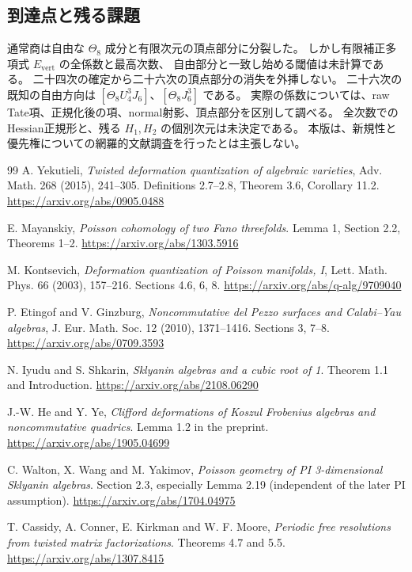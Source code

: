 \documentclass[a4paper,11pt]{ltjsarticle}
\theoremstyle{definition}
\begin{document}
\subsection{到達点と残る課題}

通常商は自由な $\Theta_8$ 成分と有限次元の頂点部分に分裂した。
しかし有限補正多項式 $E_{\mathrm{vert}}$ の全係数と最高次数、
自由部分と一致し始める閾値は未計算である。
二十四次の確定から二十六次の頂点部分の消失を外挿しない。
二十六次の既知の自由方向は
$[\Theta_8U_4^3J_6]$、$[\Theta_8J_6^3]$ である。
実際の係数については、raw Tate項、正規化後の項、normal射影、頂点部分を区別して調べる。
全次数でのHessian正規形と、残る $H_1,H_2$ の個別次元は未決定である。
本版は、新規性と優先権についての網羅的文献調査を行ったとは主張しない。


\begin{thebibliography}{99}
\small
{}
A. Yekutieli,
\emph{Twisted deformation quantization of algebraic varieties},
Adv. Math. 268 (2015), 241--305.
Definitions 2.7--2.8, Theorem 3.6, Corollary 11.2.
\url{https://arxiv.org/abs/0905.0488}

E. Mayanskiy,
\emph{Poisson cohomology of two Fano threefolds}.
Lemma 1, Section 2.2, Theorems 1--2.
\url{https://arxiv.org/abs/1303.5916}

M. Kontsevich,
\emph{Deformation quantization of Poisson manifolds, I},
Lett. Math. Phys. 66 (2003), 157--216.
Sections 4.6, 6, 8.
\url{https://arxiv.org/abs/q-alg/9709040}

P. Etingof and V. Ginzburg,
\emph{Noncommutative del Pezzo surfaces and Calabi--Yau algebras},
J. Eur. Math. Soc. 12 (2010), 1371--1416.
Sections 3, 7--8.
\url{https://arxiv.org/abs/0709.3593}

N. Iyudu and S. Shkarin,
\emph{Sklyanin algebras and a cubic root of 1}.
Theorem 1.1 and Introduction.
\url{https://arxiv.org/abs/2108.06290}

J.-W. He and Y. Ye,
\emph{Clifford deformations of Koszul Frobenius algebras and noncommutative quadrics}.
Lemma 1.2 in the preprint.
\url{https://arxiv.org/abs/1905.04699}

C. Walton, X. Wang and M. Yakimov,
\emph{Poisson geometry of PI 3-dimensional Sklyanin algebras}.
Section 2.3, especially Lemma 2.19 (independent of the later PI assumption).
\url{https://arxiv.org/abs/1704.04975}

T. Cassidy, A. Conner, E. Kirkman and W. F. Moore,
\emph{Periodic free resolutions from twisted matrix factorizations}.
Theorems 4.7 and 5.5.
\url{https://arxiv.org/abs/1307.8415}


\end{thebibliography}
\end{document}
